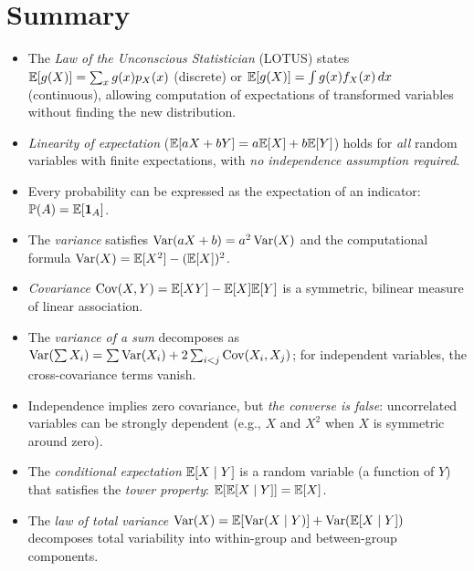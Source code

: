 \documentclass[11pt,a4paper]{article}
\begin{document}

\section{Summary}
\label{sec:summary}

\begin{itemize}
    \item The \emph{Law of the Unconscious Statistician} (LOTUS) states
    $\mathbb{E}[g(X)] = \sum_x g(x) p_X(x)$ (discrete) or
    $\mathbb{E}[g(X)] = \int g(x) f_X(x)\,dx$ (continuous), allowing
    computation of expectations of transformed variables without
    finding the new distribution.
    \item \emph{Linearity of expectation}
    ($\mathbb{E}[aX + bY] = a\mathbb{E}[X] + b\mathbb{E}[Y]$) holds for \emph{all} random
    variables with finite expectations, with \emph{no independence
    assumption required}.
    \item Every probability can be expressed as the expectation of an
    indicator: $\mathbb{P}(A) = \mathbb{E}[\mathbf{1}_A]$.
    \item The \emph{variance} satisfies $\operatorname{Var}(aX + b) = a^2\operatorname{Var}(X)$
    and the computational formula
    $\operatorname{Var}(X) = \mathbb{E}[X^2] - (\mathbb{E}[X])^2$.
    \item \emph{Covariance} $\operatorname{Cov}(X,Y) = \mathbb{E}[XY] - \mathbb{E}[X]\mathbb{E}[Y]$ is
    a symmetric, bilinear measure of linear association.
    \item The \emph{variance of a sum} decomposes as
    $\operatorname{Var}(\sum X_i) = \sum \operatorname{Var}(X_i) + 2\sum_{i<j} \operatorname{Cov}(X_i,X_j)$;
    for independent variables, the cross-covariance terms vanish.
    \item Independence implies zero covariance, but \emph{the converse
    is false}: uncorrelated variables can be strongly dependent
    (e.g., $X$ and $X^2$ when $X$ is symmetric around zero).
    \item The \emph{conditional expectation} $\mathbb{E}[X \mid Y]$ is a
    random variable (a function of $Y$) that satisfies the
    \emph{tower property}: $\mathbb{E}[\mathbb{E}[X \mid Y]] = \mathbb{E}[X]$.
    \item The \emph{law of total variance}
    $\operatorname{Var}(X) = \mathbb{E}[\operatorname{Var}(X \mid Y)] + \operatorname{Var}(\mathbb{E}[X \mid Y])$ decomposes
    total variability into within-group and between-group components.
\end{itemize}

\end{document}
